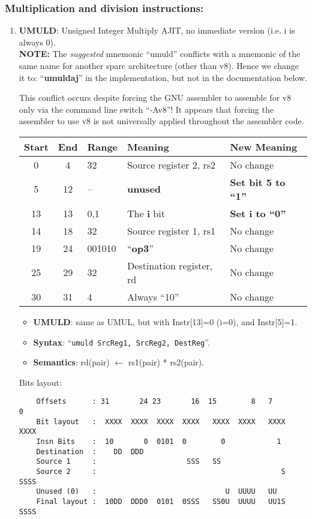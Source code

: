 \subsubsection{Multiplication and division instructions:}
\label{sec:mul:div:insn:impl}
\begin{enumerate}
\item \textbf{UMULD}: Unsigned Integer Multiply AJIT, no immediate
  version (i.e. i is always 0).\\
	\textbf{NOTE:} The \emph{suggested} mnemonic ``umuld'' conflicts with a mnemonic of the same name for another sparc architecture (other than v8).   Hence we change it to: ``\textbf{umuldaj}'' in the implementation, but not in the documentation below.

 This conflict occurs despite forcing the GNU assembler to assemble for v8 only via the command line switch ``-Av8''! It appears that forcing the assembler to use v8 is not universally applied throughout the assembler code. 
  \begin{center}
    \begin{tabular}[p]{|c|c|l|l|l|}
      \hline
      \textbf{Start} & \textbf{End} & \textbf{Range} & \textbf{Meaning} &
                                                                          \textbf{New Meaning}\\
      \hline
      0 & 4 & 32 & Source register 2, rs2 & No change \\
      5 & 12 & -- & \textbf{unused} & \textbf{Set bit 5 to ``1''} \\
      13 & 13 & 0,1 & The \textbf{i} bit & \textbf{Set i to ``0''} \\
      14 & 18 & 32 & Source register 1, rs1 & No change \\
      19 & 24 & 001010 & ``\textbf{op3}'' & No change \\
      25 & 29 & 32 & Destination register, rd & No change \\
      30 & 31 & 4 & Always ``10'' & No change \\
      \hline
    \end{tabular}
  \end{center}
  \begin{itemize}
  \item []\textbf{UMULD}: same as UMUL, but with Instr[13]=0 (i=0), and
    Instr[5]=1.
  \item []\textbf{Syntax}: ``\texttt{umuld  SrcReg1, SrcReg2, DestReg}''.
  \item []\textbf{Semantics}: rd(pair) $\leftarrow$ rs1(pair) * rs2(pair).
  \end{itemize}
  Bits layout:
\begin{verbatim}
    Offsets      : 31       24 23       16  15        8   7        0
    Bit layout   :  XXXX  XXXX  XXXX  XXXX   XXXX  XXXX   XXXX  XXXX
    Insn Bits    :  10       0  0101  0        0            1       
    Destination  :    DD  DDD                                       
    Source 1     :                     SSS   SS
    Source 2     :                                           S  SSSS
    Unused (0)   :                              U  UUUU   UU        
    Final layout :  10DD  DDD0  0101  0SSS   SS0U  UUUU   UU1S  SSSS
\end{verbatim}


\end{enumerate}
